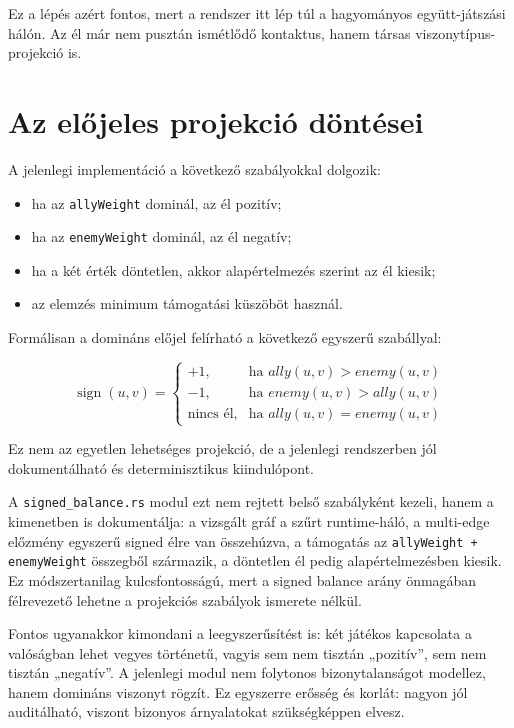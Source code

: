 \documentclass[a4paper,12pt]{report}
\begin{document}
Ez a lépés azért fontos, mert a rendszer itt lép túl a hagyományos együtt-játszási hálón. Az él már nem pusztán ismétlődő kontaktus, hanem társas viszonytípus-projekció is.

\section{Az előjeles projekció döntései}

A jelenlegi implementáció a következő szabályokkal dolgozik:

\begin{itemize}
    \item ha az \texttt{allyWeight} dominál, az él pozitív;
    \item ha az \texttt{enemyWeight} dominál, az él negatív;
    \item ha a két érték döntetlen, akkor alapértelmezés szerint az él kiesik;
    \item az elemzés minimum támogatási küszöböt használ.
\end{itemize}

Formálisan a domináns előjel felírható a következő egyszerű szabállyal:

\begin{equation}
\operatorname{sign}(u,v)=
\begin{cases}
+1, & \text{ha } ally(u,v) > enemy(u,v) \\
-1, & \text{ha } enemy(u,v) > ally(u,v) \\
\text{nincs él}, & \text{ha } ally(u,v)=enemy(u,v)
\end{cases}
\end{equation}

Ez nem az egyetlen lehetséges projekció, de a jelenlegi rendszerben jól dokumentálható és determinisztikus kiindulópont.

A \texttt{signed\_balance.rs} modul ezt nem rejtett belső szabályként kezeli, hanem a kimenetben is dokumentálja: a vizsgált gráf a szűrt runtime-háló, a multi-edge előzmény egyszerű signed élre van összehúzva, a támogatás az \texttt{allyWeight + enemyWeight} összegből származik, a döntetlen él pedig alapértelmezésben kiesik. Ez módszertanilag kulcsfontosságú, mert a signed balance arány önmagában félrevezető lehetne a projekciós szabályok ismerete nélkül.

Fontos ugyanakkor kimondani a leegyszerűsítést is: két játékos kapcsolata a valóságban lehet vegyes történetű, vagyis sem nem tisztán „pozitív”, sem nem tisztán „negatív”. A jelenlegi modul nem folytonos bizonytalanságot modellez, hanem domináns viszonyt rögzít. Ez egyszerre erősség és korlát: nagyon jól auditálható, viszont bizonyos árnyalatokat szükségképpen elvesz.
\end{document}
